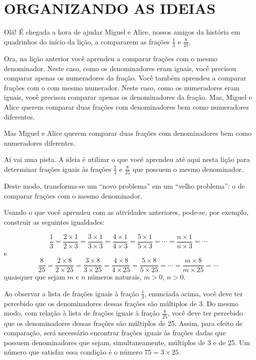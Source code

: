 \documentclass[a4,12pt]{book}
\begin{document}
\section{ORGANIZANDO AS IDEIAS }




Olá! É chegada a hora de ajudar Miguel e Alice, nossos amigos da história em quadrinhos do início da lição, a compararem as frações $\frac{1}{3}$ e $\frac{8}{25}$.

Ora, na lição anterior você aprendeu a comparar frações com o mesmo denominador. Neste caso, como os denominadores eram iguais, você precisou comparar apenas os numeradores da fração. Você também aprendeu a comparar frações com o com mesmo numerador. Neste caso, como os numeradores eram iguais, você precisou comparar apenas os denominadores da fração. Mas, Miguel e Alice querem comparar duas frações com denominadores bem como numeradores diferentes.

Mas Miguel e Alice querem comparar duas frações com denominadores bem como numeradores diferentes.

Aí vai uma pista.  A ideia é utilizar o que você aprendeu até aqui nesta lição para determinar frações iguais às frações $\frac{1}{3}$ e $\frac{8}{25}$ que possuem o mesmo denominador. 

Deste modo, transforma-se um ``novo problema'' em um ``velho problema'': o de comparar frações com o mesmo denominador.

Usando o que você aprendeu com as atividades anteriores, pode-se, por exemplo, construir as seguintes igualdades:  

$$\dfrac{1}{3} = \dfrac{2 \times 1}{2 \times 3} = \dfrac{3 \times 1}{3 \times 3} = \dfrac{4 \times 1}{4 \times 3} = \dfrac{5 \times 1}{5 \times 3} = \cdots = \dfrac{n \times 1}{n\times 3} = \cdots$$
e
$$\dfrac{8}{25} = \dfrac{2 \times 8}{2 \times 25} = \dfrac{3 \times 8}{3 \times 25} = \dfrac{4 \times 8}{4 \times 25} = \dfrac{5 \times 8}{5 \times 25} = \cdots = \dfrac{m \times 8}{m\times 25} = \cdots$$
quaisquer que sejam $m$ e $n$ números naturais, $m > 0$, $n > 0$.

Ao observar a lista de frações iguais à fração $\frac{1}{3}$, enunciada acima, você deve ter percebido que os denominadores dessas frações são múltiplos de 3.  Do mesmo modo, com relação à lista de frações iguais à fração $\frac{8}{25}$, você deve ter percebido que os denominadores dessas frações são múltiplos de 25. Assim, para efeito de comparação, será necessário encontrar frações iguais às frações dadas que possuem denominadores que sejam, simultaneamente, múltiplos de 3 e de 25. Um número que satisfaz essa condição é o número $75 = 3 \times 25$.
\end{document}

